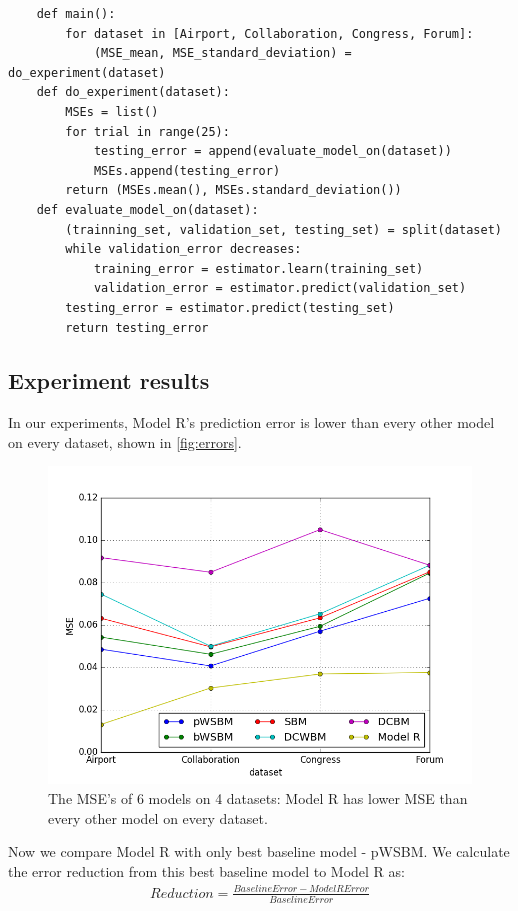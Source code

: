 \documentclass[letterpaper]{article}
\begin{document}
\begin{lstlisting}
	def main():
		for dataset in [Airport, Collaboration, Congress, Forum]:
			(MSE_mean, MSE_standard_deviation) = do_experiment(dataset)
	def do_experiment(dataset):
		MSEs = list()
		for trial in range(25):
			testing_error = append(evaluate_model_on(dataset))
			MSEs.append(testing_error)
		return (MSEs.mean(), MSEs.standard_deviation())
	def evaluate_model_on(dataset):
		(trainning_set, validation_set, testing_set) = split(dataset)
		while validation_error decreases:
			training_error = estimator.learn(training_set)
			validation_error = estimator.predict(validation_set)
		testing_error = estimator.predict(testing_set)
		return testing_error
\end{lstlisting}

\subsection{Experiment results}
In our experiments,
Model R's prediction error is lower than every other model on every dataset,
shown in \autoref{fig:errors}.
\begin{figure}[!htb]
	\centering
	\includegraphics[width=\textwidth]{link-weight-errors}
	\caption[content...]{
		The MSE's of 6 models on 4 datasets:
		Model R has lower MSE than every other model on every dataset.
	}
	\label{fig:errors}
\end{figure}
Now we compare Model R with only best baseline model - pWSBM.
We calculate the error reduction from this best baseline model to Model R as:
\begin{align*}
	Reduction = \frac{BaselineError - ModelRError}{BaselineError}
\end{align*}
\end{document}
